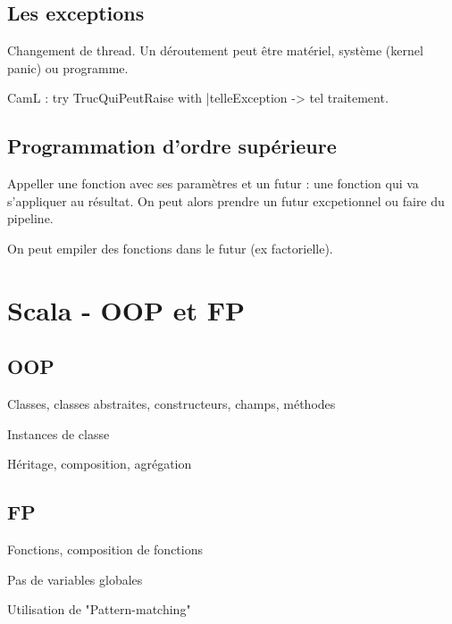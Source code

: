 \documentclass[french]{article}
\begin{document}
\subsection{Les exceptions}
Changement de thread. Un déroutement peut être matériel, système (kernel panic) ou programme.

CamL : try TrucQuiPeutRaise with |telleException -> tel traitement.

\subsection{Programmation d'ordre supérieure}
Appeller une fonction avec ses paramètres et un futur : une fonction qui va s'appliquer au résultat. On peut alors prendre un futur excpetionnel ou faire du pipeline.

On peut empiler des fonctions dans le futur (ex factorielle).


\section{Scala - OOP et FP}

\subsection{OOP}

Classes, classes abstraites, constructeurs, champs, méthodes

Instances de classe

Héritage, composition, agrégation

\subsection{FP}

Fonctions, composition de fonctions

Pas de variables globales

Utilisation de "Pattern-matching"
\end{document}

